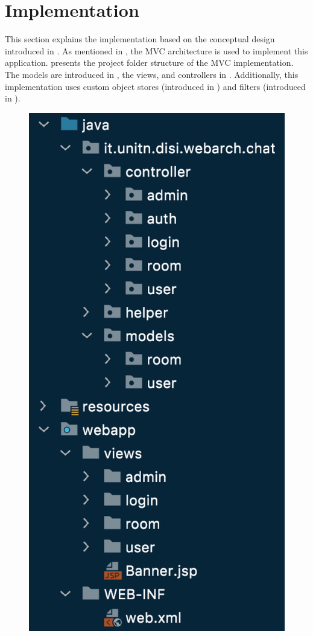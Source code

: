 \section{Implementation}\label{sec:03_impl}
This section explains the implementation based on the conceptual design introduced in . 
As mentioned in , the MVC architecture is used to implement this application.  presents the project folder structure of the MVC implementation.
The models are introduced in , the views, and controllers in .
Additionally, this implementation uses custom object stores (introduced in ) and filters (introduced in ).
\begin{figure}[h]
\centering
\includegraphics[scale=0.5]{images/03_impl/structure}

\end{figure}
